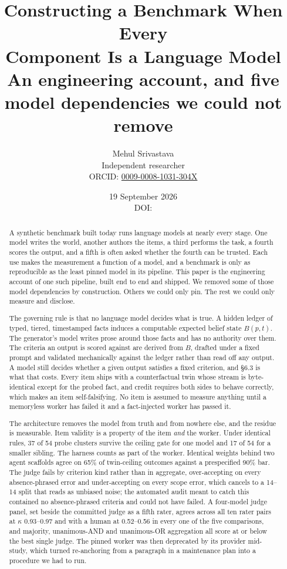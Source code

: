 \documentclass[11pt]{article}
\title{\textbf{Constructing a Benchmark When Every\\Component Is a Language Model}\\[.35em]
\large An engineering account, and five model dependencies we could not
remove}
\author{Mehul Srivastava\\\normalsize Independent researcher\\
\normalsize ORCID: \href{https://orcid.org/0009-0008-1031-304X}{0009-0008-1031-304X}}
\date{19 September 2026\\[.45em]
\normalsize DOI: \href{https://doi.org/\zenodoDOI}{\zenodoDOI}}
\begin{document}
\maketitle

\begin{abstract}
\noindent A synthetic benchmark built today runs language models at nearly
every stage. One model writes the world, another authors the items, a third
performs the task, a fourth scores the output, and a fifth is often asked
whether the fourth can be trusted. Each use makes the measurement a function
of a model, and a benchmark is only as reproducible as the least pinned model
in its pipeline. This paper is the engineering account of one such pipeline,
built end to end and shipped. We removed some of those model dependencies by
construction. Others we could only pin. The rest we could only measure and
disclose.

The governing rule is that no language model decides what is true. A hidden
ledger of typed, tiered, timestamped facts induces a computable expected belief
state $B(p,t)$. The generator's model writes prose around those facts and has no
authority over them. The criteria an output is scored against are derived from
$B$, drafted under a fixed prompt and validated mechanically against the ledger
rather than read off any output. A model still decides
whether a given output satisfies a fixed criterion, and \S6.3 is what that
costs. Every item ships with a
counterfactual twin whose stream is byte-identical except for the probed fact,
and credit requires both sides to behave correctly, which makes an item
self-falsifying. No item is assumed to measure anything until a memoryless
worker has failed it and a fact-injected worker has passed it.

The architecture removes the model from truth and from nowhere else, and the
residue is measurable. Item validity is a property of
the item \emph{and} the worker. Under identical rules, 37 of 54 probe clusters
survive the ceiling gate for one model and 17 of 54 for a smaller sibling. The
harness counts as part of the worker. Identical weights behind two agent
scaffolds agree on 65\% of twin-ceiling outcomes against a prespecified 90\%
bar. The judge fails by criterion kind rather than in aggregate,
over-accepting on every absence-phrased error and under-accepting on every
scope error, which cancels to a 14--14 split that reads as unbiased noise; the
automated audit meant to catch this contained no absence-phrased criteria and
could not have failed. A four-model judge panel, set beside the committed
judge as a fifth rater, agrees across all ten rater pairs at $\kappa$
0.93--0.97 and with a human at 0.52--0.56 in every one of the five
comparisons, and majority, unanimous-AND and unanimous-OR aggregation all
score at or below the best single judge. The
pinned worker was then deprecated by its provider mid-study, which turned
re-anchoring from a paragraph in a maintenance plan into a procedure we had to
run.


\end{abstract}
\end{document}
